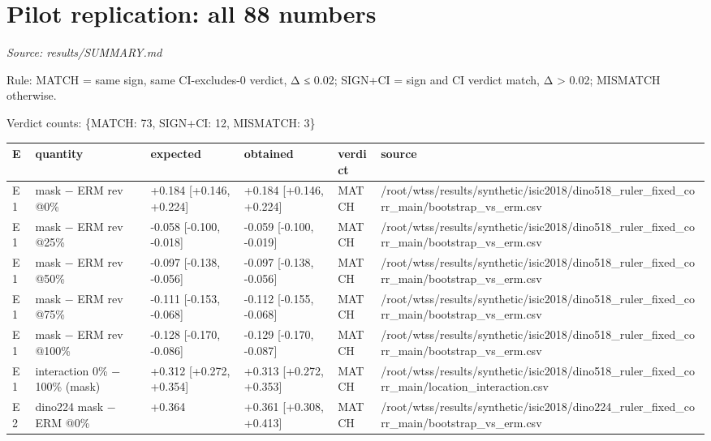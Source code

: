 \section{Pilot replication: all 88 numbers}
\noindent\textit{Source: results/SUMMARY.md}

{\small
Rule: MATCH = same sign, same CI-excludes-0 verdict, \textbar Δ\textbar{} ≤ 0.02; SIGN+CI = sign and CI verdict match, \textbar Δ\textbar{} \textgreater{} 0.02; MISMATCH otherwise.

Verdict counts: \{\textquotesingle MATCH\textquotesingle: 73, \textquotesingle SIGN+CI\textquotesingle: 12, \textquotesingle MISMATCH\textquotesingle: 3\}

{ %
\begin{longtable}[]{@{}llllll@{}}
\toprule\noalign{}
E & quantity & expected & obtained & verdict & source \\
\midrule\noalign{}
\endhead
\bottomrule\noalign{}
\endlastfoot
E1 & mask − ERM rev @0\% & +0.184 {[}+0.146, +0.224{]} & +0.184 {[}+0.146, +0.224{]} & MATCH & /root/wtss/results/synthetic/isic2018/dino518\_ruler\_fixed\_corr\_main/bootstrap\_vs\_erm.csv \\
E1 & mask − ERM rev @25\% & -0.058 {[}-0.100, -0.018{]} & -0.059 {[}-0.100, -0.019{]} & MATCH & /root/wtss/results/synthetic/isic2018/dino518\_ruler\_fixed\_corr\_main/bootstrap\_vs\_erm.csv \\
E1 & mask − ERM rev @50\% & -0.097 {[}-0.138, -0.056{]} & -0.097 {[}-0.138, -0.056{]} & MATCH & /root/wtss/results/synthetic/isic2018/dino518\_ruler\_fixed\_corr\_main/bootstrap\_vs\_erm.csv \\
E1 & mask − ERM rev @75\% & -0.111 {[}-0.153, -0.068{]} & -0.112 {[}-0.155, -0.068{]} & MATCH & /root/wtss/results/synthetic/isic2018/dino518\_ruler\_fixed\_corr\_main/bootstrap\_vs\_erm.csv \\
E1 & mask − ERM rev @100\% & -0.128 {[}-0.170, -0.086{]} & -0.129 {[}-0.170, -0.087{]} & MATCH & /root/wtss/results/synthetic/isic2018/dino518\_ruler\_fixed\_corr\_main/bootstrap\_vs\_erm.csv \\
E1 & interaction 0\% − 100\% (mask) & +0.312 {[}+0.272, +0.354{]} & +0.313 {[}+0.272, +0.353{]} & MATCH & /root/wtss/results/synthetic/isic2018/dino518\_ruler\_fixed\_corr\_main/location\_interaction.csv \\
E2 & dino224 mask − ERM @0\% & +0.364 & +0.361 {[}+0.308, +0.413{]} & MATCH & /root/wtss/results/synthetic/isic2018/dino224\_ruler\_fixed\_corr\_main/bootstrap\_vs\_erm.csv \\

\end{longtable}}}
